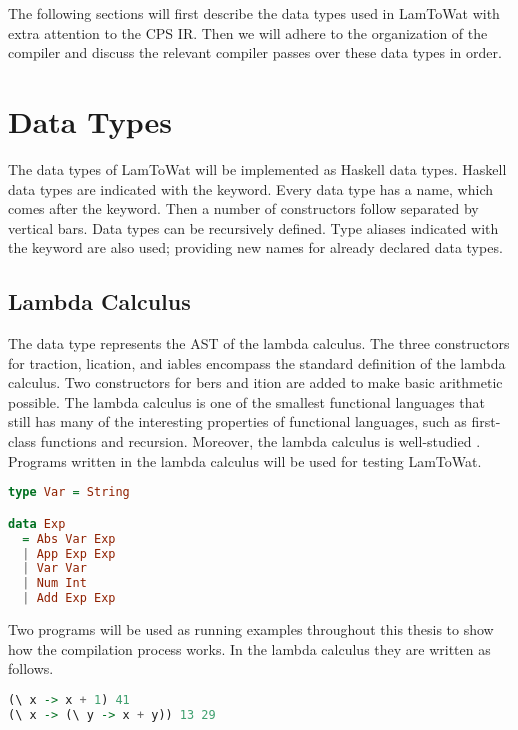 The following sections will first describe the data types used in LamToWat with extra attention to the \ac{CPS} \ac{IR}. Then we will adhere to the organization of the compiler and discuss the relevant compiler passes over these data types in order.

\section{\label{section:datatypes}Data Types}
The data types of LamToWat will be implemented as Haskell data types. Haskell data types are indicated with the  keyword. Every data type has a name, which comes after the keyword. Then a number of constructors follow separated by vertical bars. Data types can be recursively defined. Type aliases indicated with the  keyword are also used; providing new names for already declared data types.

\subsection{\label{subsection:expdata}Lambda Calculus}
The  data type represents the \ac{AST} of the lambda calculus. The three constructors for traction, lication, and iables encompass the standard definition of the lambda calculus. Two constructors for bers and ition are added to make basic arithmetic possible. The lambda calculus is one of the smallest functional languages that still has many of the interesting properties of functional languages, such as first-class functions and recursion. Moreover, the lambda calculus is well-studied \autocite{barendregt1984lambda}. Programs written in the lambda calculus will be used for testing LamToWat.

\begin{lstlisting}[language=Haskell]
type Var = String

data Exp
  = Abs Var Exp
  | App Exp Exp
  | Var Var
  | Num Int
  | Add Exp Exp
\end{lstlisting}

Two programs will be used as running examples throughout this thesis to show how the compilation process works. In the lambda calculus they are written as follows.

\begin{lstlisting}[language=Haskell]
(\ x -> x + 1) 41
(\ x -> (\ y -> x + y)) 13 29
\end{lstlisting}

